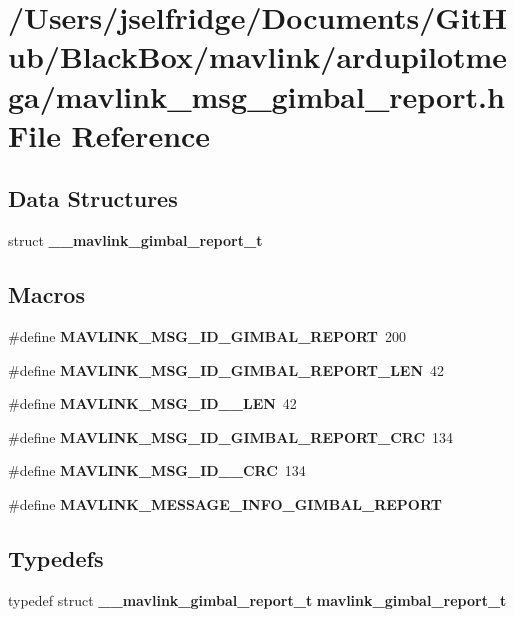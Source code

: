 \section{/\+Users/jselfridge/\+Documents/\+Git\+Hub/\+Black\+Box/mavlink/ardupilotmega/mavlink\+\_\+msg\+\_\+gimbal\+\_\+report.h File Reference}
\label{mavlink__msg__gimbal__report_8h}
\subsection*{Data Structures}
\begin{DoxyCompactItemize}
\item 
struct \textbf{ \+\_\+\+\_\+mavlink\+\_\+gimbal\+\_\+report\+\_\+t}
\end{DoxyCompactItemize}
\subsection*{Macros}
\begin{DoxyCompactItemize}
\item 
\#define \textbf{ M\+A\+V\+L\+I\+N\+K\+\_\+\+M\+S\+G\+\_\+\+I\+D\+\_\+\+G\+I\+M\+B\+A\+L\+\_\+\+R\+E\+P\+O\+RT}~200
\item 
\#define \textbf{ M\+A\+V\+L\+I\+N\+K\+\_\+\+M\+S\+G\+\_\+\+I\+D\+\_\+\+G\+I\+M\+B\+A\+L\+\_\+\+R\+E\+P\+O\+R\+T\+\_\+\+L\+EN}~42
\item 
\#define \textbf{ M\+A\+V\+L\+I\+N\+K\+\_\+\+M\+S\+G\+\_\+\+I\+D\+\_\+\_\+\+L\+EN}~42
\item 
\#define \textbf{ M\+A\+V\+L\+I\+N\+K\+\_\+\+M\+S\+G\+\_\+\+I\+D\+\_\+\+G\+I\+M\+B\+A\+L\+\_\+\+R\+E\+P\+O\+R\+T\+\_\+\+C\+RC}~134
\item 
\#define \textbf{ M\+A\+V\+L\+I\+N\+K\+\_\+\+M\+S\+G\+\_\+\+I\+D\+\_\+\_\+\+C\+RC}~134
\item 
\#define \textbf{ M\+A\+V\+L\+I\+N\+K\+\_\+\+M\+E\+S\+S\+A\+G\+E\+\_\+\+I\+N\+F\+O\+\_\+\+G\+I\+M\+B\+A\+L\+\_\+\+R\+E\+P\+O\+RT}
\end{DoxyCompactItemize}
\subsection*{Typedefs}
\begin{DoxyCompactItemize}
\item 
typedef struct \textbf{ \+\_\+\+\_\+mavlink\+\_\+gimbal\+\_\+report\+\_\+t} \textbf{ mavlink\+\_\+gimbal\+\_\+report\+\_\+t}
\end{DoxyCompactItemize}


